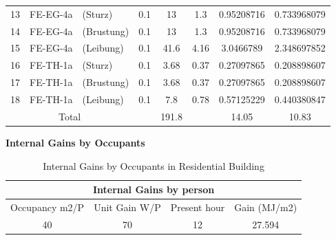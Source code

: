 \documentclass[a4paper, oneside]{discothesis}
\begin{document}
\begin{table}[H]
\begin{tabular}{ccrccccc}
		    13   & \multicolumn{1}{r}{FE-EG-4a} & \multicolumn{1}{l}{(Sturz)} & 0.1  & 13   & 1.3  & 0.95208716 & 0.733968079 \\
		    14   & \multicolumn{1}{r}{FE-EG-4a} & \multicolumn{1}{l}{(Brustung)} & 0.1  & 13   & 1.3  & 0.95208716 & 0.733968079 \\
		    15   & \multicolumn{1}{r}{FE-EG-4a} & \multicolumn{1}{l}{(Leibung)} & 0.1  & 41.6 & 4.16 & 3.0466789 & 2.348697852 \\
		    16   & \multicolumn{1}{r}{FE-TH-1a} & \multicolumn{1}{l}{(Sturz)} & 0.1  & 3.68 & 0.37 & 0.27097865 & 0.208898607 \\
		    17   & \multicolumn{1}{r}{FE-TH-1a} & \multicolumn{1}{l}{(Brustung)} & 0.1  & 3.68 & 0.37 & 0.27097865 & 0.208898607 \\
		    18   & \multicolumn{1}{r}{FE-TH-1a} & \multicolumn{1}{l}{(Leibung)} & 0.1  & 7.8  & 0.78 & 0.57125229 & 0.440380847 \\
		    \midrule
		    \multicolumn{3}{c}{Total} &     & 191.8 &            & 14.05 & 10.83 \\
		    \bottomrule
		    \end{tabular}%
		  \label{tab:HonggerThermalBridge}%
		\end{table}%

		\textbf{Internal Gains by Occupants}\\ 
		\begin{table}[htbp]
		\centering
		\caption{Internal Gains by Occupants in Residential Building}
		    \begin{tabular}{cccc}
		    \toprule
		    \multicolumn{4}{c}{Internal Gains by person} \\
		    \midrule
		    \multicolumn{1}{p{8.07em}}{Occupancy m2/P} & \multicolumn{1}{p{7em}}{Unit Gain W/P} & \multicolumn{1}{p{7.355em}}{Present hour } & \multicolumn{1}{p{7.355em}}{Gain (MJ/m2)} \\
		    40    & 70    & 12    & 27.594 \\
		    \bottomrule
		    \end{tabular}%
		  \label{tab:HonggOccupancyGain}%
		\end{table}%
\end{document}
